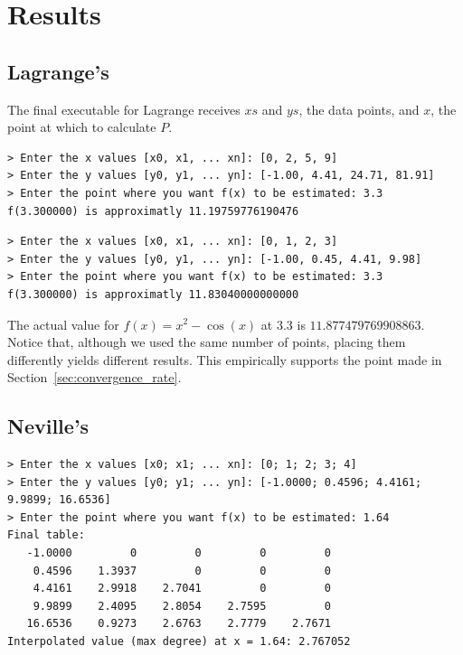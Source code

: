\documentclass[12pt]{article}
\theoremstyle{plain}
\theoremstyle{remark}
\begin{document}
\section{Results}\label{sec:results}

\subsection{Lagrange's}

The final executable for Lagrange receives $xs$ and $ys$, the data points, and $x$, the point at which to calculate $P$.

\begin{lstlisting}[caption={First execution of Lagrange's}]
> Enter the x values [x0, x1, ... xn]: [0, 2, 5, 9]
> Enter the y values [y0, y1, ... yn]: [-1.00, 4.41, 24.71, 81.91]
> Enter the point where you want f(x) to be estimated: 3.3
f(3.300000) is approximatly 11.19759776190476
\end{lstlisting}

\begin{lstlisting}[caption={Second execution of Lagrange's}]
> Enter the x values [x0, x1, ... xn]: [0, 1, 2, 3]
> Enter the y values [y0, y1, ... yn]: [-1.00, 0.45, 4.41, 9.98]
> Enter the point where you want f(x) to be estimated: 3.3
f(3.300000) is approximatly 11.83040000000000
\end{lstlisting}

The actual value for $f(x) = x^2 - \cos(x)$ at $3.3$ is $11.877479769908863$. Notice that, although we used the same number of points, placing them differently yields different results. This empirically supports the point made in Section~\ref{sec:convergence_rate}.

\subsection{Neville's}

\begin{lstlisting}[caption={First execution of Neville's}]
> Enter the x values [x0; x1; ... xn]: [0; 1; 2; 3; 4]
> Enter the y values [y0; y1; ... yn]: [-1.0000; 0.4596; 4.4161; 9.9899; 16.6536]
> Enter the point where you want f(x) to be estimated: 1.64
Final table:
   -1.0000         0         0         0         0
    0.4596    1.3937         0         0         0
    4.4161    2.9918    2.7041         0         0
    9.9899    2.4095    2.8054    2.7595         0
   16.6536    0.9273    2.6763    2.7779    2.7671
Interpolated value (max degree) at x = 1.64: 2.767052
\end{lstlisting}
\end{document}
